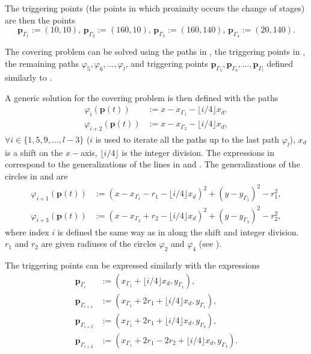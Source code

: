 The triggering points (the points in which proximity occurs the change of stages) are then the points
\begin{equation}\label{eq:basic-plan-trigs}
  \mathbf{p}_{\Gamma_1}:=(10,10),\,\mathbf{p}_{\Gamma_2}:=(160,10),\,\mathbf{p}_{\Gamma_3}:=(160,140),\,\mathbf{p}_{\Gamma_4}:=(20,140).
\end{equation}

The covering problem can be solved using the paths in , the triggering points in , the remaining paths $\varphi_5,\varphi_6,\dots,\varphi_l$, and triggering points $\mathbf{p}_{\Gamma_5},\mathbf{p}_{\Gamma_6},\dots,\mathbf{p}_{\Gamma_l}$ defined similarly to .

A generic solution for the covering problem is then defined with the paths
\begin{subequations}\label{eq:line-gene}\begin{align}
  \varphi_i(\mathbf{p}(t))&:=x-x_{\Gamma_1}-\lfloor i/4\rfloor x_d,\\
  \varphi_{i+2}(\mathbf{p}(t))&:=x-x_{\Gamma_2}-\lfloor i/4\rfloor x_d,
\end{align}
\end{subequations}
$\forall i\in\{1,5,9,\dots,l-3\}$ ($i$ is used to iterate all the paths up to the last path $\varphi_l$), $x_d$ is a shift on the $x-$axis, $\lfloor i/4\rfloor$ is the integer division. The expressions in  correspond to the generalizations of the lines in  and . The generalizations of the circles in  and  are
\begin{subequations}\begin{align}
  \varphi_{i+1}(\mathbf{p}(t))&:=(x-x_{\Gamma_1}-r_1-\lfloor i/4\rfloor x_d)^2+(y-y_{\Gamma_1})^2-r_1^2,\\
  \varphi_{i+3}(\mathbf{p}(t))&:=(x-x_{\Gamma_2}+r_2-\lfloor i/4\rfloor x_d)^2+(y-y_{\Gamma_3})^2-r_2^2,\label{eq:second-circ-gene}
\end{align}
\end{subequations}
where index $i$ is defined the same way as in  along the shift and integer division. $r_1$ and $r_2$ are given radiuses of the circles $\varphi_2$ and $\varphi_4$ (see ).

The triggering points can be expressed similarly with the expressions
\begin{subequations}\label{eq:trigs-gene}\begin{align}
  \mathbf{p}_{\Gamma_i}&:=(x_{\Gamma_1}+\lfloor i/4\rfloor x_d,y_{\Gamma_1}),\\
  \mathbf{p}_{\Gamma_{i+1}}&:=(x_{\Gamma_1}+2r_1+\lfloor i/4\rfloor x_d,y_{\Gamma_1}),\\
  \mathbf{p}_{\Gamma_{i+2}}&:=(x_{\Gamma_1}+2r_1+\lfloor i/4\rfloor x_d,y_{\Gamma_3}),\\
  \mathbf{p}_{\Gamma_{i+2}}&:=(x_{\Gamma_1}+2r_1-2r_2+\lfloor i/4\rfloor x_d,y_{\Gamma_3})\label{eq:last-trig-gene}.
\end{align}
\end{subequations}

